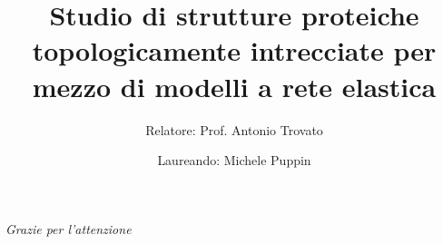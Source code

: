 \documentclass{beamer}
\title{Studio di strutture proteiche topologicamente intrecciate per mezzo di modelli a rete elastica}
\author[Michele Puppin]{Relatore: Prof. Antonio Trovato}
\date{Laureando: Michele Puppin}
\institute[]
\begin{document}
	
\begin{frame}
	\maketitle
\end{frame}

\begin{frame}
	\it{\LARGE Grazie per l'attenzione}		
\end{frame}
\end{document}

